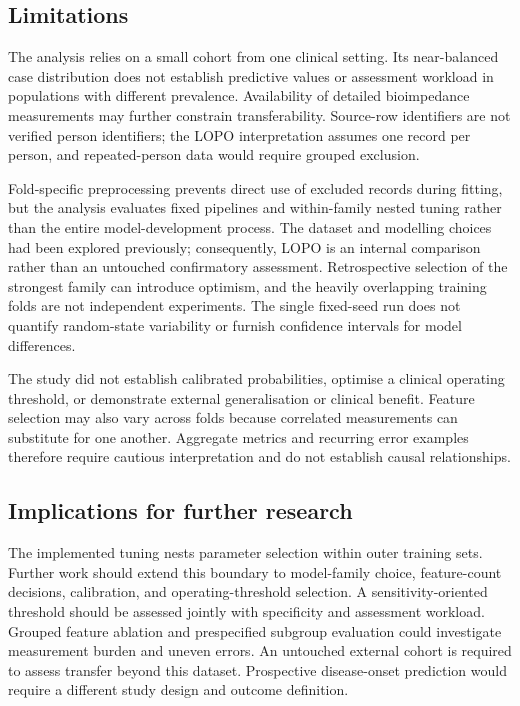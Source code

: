 \subsection{Limitations}
The analysis relies on a small cohort from one clinical setting. Its near-balanced case distribution does not establish predictive values or assessment workload in populations with different prevalence. Availability of detailed bioimpedance measurements may further constrain transferability. Source-row identifiers are not verified person identifiers; the LOPO interpretation assumes one record per person, and repeated-person data would require grouped exclusion.

Fold-specific preprocessing prevents direct use of excluded records during fitting, but the analysis evaluates fixed pipelines and within-family nested tuning rather than the entire model-development process. The dataset and modelling choices had been explored previously; consequently, LOPO is an internal comparison rather than an untouched confirmatory assessment. Retrospective selection of the strongest family can introduce optimism, and the heavily overlapping training folds are not independent experiments. The single fixed-seed run does not quantify random-state variability or furnish confidence intervals for model differences.

The study did not establish calibrated probabilities, optimise a clinical operating threshold, or demonstrate external generalisation or clinical benefit. Feature selection may also vary across folds because correlated measurements can substitute for one another. Aggregate metrics and recurring error examples therefore require cautious interpretation and do not establish causal relationships.

\subsection{Implications for further research}
The implemented tuning nests parameter selection within outer training sets. Further work should extend this boundary to model-family choice, feature-count decisions, calibration, and operating-threshold selection. A sensitivity-oriented threshold should be assessed jointly with specificity and assessment workload. Grouped feature ablation and prespecified subgroup evaluation could investigate measurement burden and uneven errors. An untouched external cohort is required to assess transfer beyond this dataset. Prospective disease-onset prediction would require a different study design and outcome definition.
